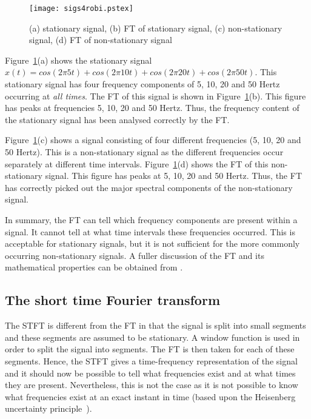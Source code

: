 \documentclass[12pt]{report}
\begin{document}
\begin{figure}[!ht]
\setlength{\abovecaptionskip}{-0.25cm}  
\begin{center}
\texttt{[image: sigs4robi.pstex]}
\end{center}
\caption{(a) stationary signal, (b) FT of stationary signal, (c) non-stationary signal, (d) FT of non-stationary signal}
\label{fig:FTstatNonStat}
\setlength{\abovecaptionskip}{0cm}  
\end{figure}

Figure~\ref{fig:FTstatNonStat}(a) shows the stationary signal $x(t) = cos(2\pi5t)+cos(2\pi10t)+cos(2\pi20t)+cos(2\pi50t)$.
This stationary signal has four frequency components of 5, 10, 20 and 50 Hertz occurring at \emph{all times}.
The FT of this signal is shown in Figure~\ref{fig:FTstatNonStat}(b). This figure
has peaks at frequencies 5, 10, 20 and 50 Hertz. Thus, the frequency content of the stationary signal has been analysed correctly by the
FT.

Figure~\ref{fig:FTstatNonStat}(c) shows a signal consisting of four different frequencies (5, 10, 20 and 50 Hertz).
This is a non-stationary signal as the different frequencies occur separately at different time intervals.
Figure~\ref{fig:FTstatNonStat}(d) shows the FT of this non-stationary signal. This figure has peaks at 5, 10, 20 and 50 Hertz.
Thus, the FT has correctly picked out the major spectral components of the non-stationary signal.





In summary, the FT can tell which frequency components are present within a signal. It cannot 
tell at what time intervals these frequencies occurred. This is acceptable for stationary signals, but
it is not sufficient for the more commonly occurring non-stationary signals.
A fuller discussion of the FT and its mathematical properties can be obtained from
\cite{jfprice, sir_mk, e_c_if, c_w_the, b_b_hub}.

\subsection{The short time Fourier transform}
The STFT is different from the FT in that the signal is
split into small segments and these segments are assumed to be stationary. A window function is used 
in order to split the signal into segments. The FT is then taken for each of these segments.
Hence, the STFT gives a time-frequency representation of the signal and it should now be possible to tell 
what frequencies exist and at what times they are present. Nevertheless, this is not the case as
it is not possible to know what frequencies exist at an exact instant in time (based upon the
Heisenberg uncertainty principle~\cite{robi}). 
\end{document}
